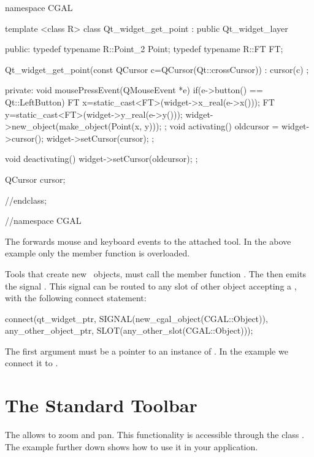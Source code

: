 \begin{ccExampleCode}
namespace CGAL {
template <class R>
class Qt_widget_get_point : public Qt_widget_layer
{
public:
  typedef typename R::Point_2   Point;
  typedef typename R::FT        FT;
  
  Qt_widget_get_point(const QCursor c=QCursor(Qt::crossCursor)) :
    cursor(c) {};
  
private:
  void mousePressEvent(QMouseEvent *e)
  {
    if(e->button() == Qt::LeftButton)
    {
      FT x=static_cast<FT>(widget->x_real(e->x()));
      FT y=static_cast<FT>(widget->y_real(e->y()));
      widget->new_object(make_object(Point(x, y)));
    }
  };
  void activating()
  {
    oldcursor = widget->cursor();
    widget->setCursor(cursor);
  };
  
  void deactivating()
  {
    widget->setCursor(oldcursor);
  };

  QCursor cursor;
}//endclass;
}//namespace CGAL
\end{ccExampleCode}

The  forwards mouse and keyboard events to the attached tool.
In the above example only the  member function is overloaded.

Tools that create new \cgal\ objects, must call the member 
function . The
 then emits the signal
. This signal can be routed to
any slot of other object accepting a , with the
following connect statement:
\begin{ccExampleCode}
connect(qt_widget_ptr, SIGNAL(new_cgal_object(CGAL::Object)), 
        any_other_object_ptr, SLOT(any_other_slot(CGAL::Object)));
\end{ccExampleCode}

The first argument must be a pointer to an instance of .
In the example we connect it to .

\section{The Standard Toolbar}
\label{Qt_widget_standard_toolbar}

The  allows to zoom and pan. This functionality is 
accessible through the class . The 
example further down shows how to use it in your application.


